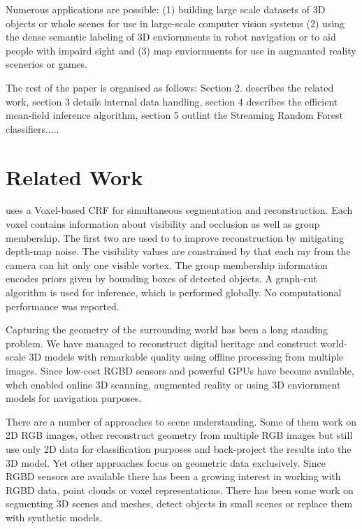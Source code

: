 \documentclass{llncs}
\begin{document}
  Numerous applications are possible: (1) building large scale datasets of 3D objects or whole scenes for use in large-scale computer vision systems (2) using the dense semantic labeling of 3D enviornments in robot navigation or to aid people with impaird sight and (3) map enviornments for use in augmanted reality scenerios or games. 
  
  The rest of the paper is organised as follows: Section 2. describes the related work, section 3 details internal data handling, section 4 describes the efficient mean-field inference algorithm, section 5 outlint the Streaming Random Forest classifiers.....


\section{Related Work}


  \cite{VCRF} uses a Voxel-based CRF for simultaneous segmentation and reconstruction. Each voxel contains information about visibility and occlusion as well as group membership. The first two are used to to improve reconstruction by mitigating depth-map noise. The visibility values are constrained by that each ray from the camera can hit only one visible vortex. The group membership information encodes priors given by bounding boxes of detected objects. A graph-cut algorithm is used for inference, which is performed globally. No computational performance was reported.   
  
    
    Capturing the geometry of the surrounding world has been a long standing problem. We have managed to reconstruct digital heritage and construct world-scale 3D models with remarkable quality using offline processing from multiple images. Since low-cost RGBD sensors and powerful GPUs have become available, whch enabled online 3D scanning, augmented reality or using 3D enviornment models for navigation purposes.
  
    
      There are a number of approaches to scene understanding. Some of them work on 2D RGB images, other reconstruct geometry from multiple RGB images but still use only 2D data for classification purposes and back-project the results into the 3D model. Yet other approaches focus on geometric data exclusively. Since RGBD sensors are available there has been a growing interest in working with RGBD data, point clouds or voxel representations. There has been some work on segmenting 3D scenes and meshes, detect objects in small scenes or replace them with synthetic models. 
      
\end{document}

